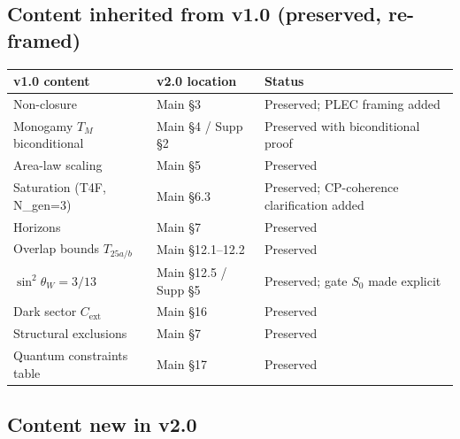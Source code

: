\documentclass[11pt]{article}
\theoremstyle{definition}
\begin{document}
\subsection{Content inherited from v1.0 (preserved, re-framed)}\label{sec:inherited_v1}

\begin{center}\small
\begin{tabular}{@{}l l l@{}}
\toprule
\textbf{v1.0 content} & \textbf{v2.0 location} & \textbf{Status} \\
\midrule
Non-closure & Main \S3 & Preserved; PLEC framing added \\
Monogamy $T_M$ biconditional & Main \S4 / Supp \S2 & Preserved with biconditional proof \\
Area-law scaling & Main \S5 & Preserved \\
Saturation (T4F, N\_gen=3) & Main \S6.3 & Preserved; CP-coherence clarification added \\
Horizons & Main \S7 & Preserved \\
Overlap bounds $T_{25a/b}$ & Main \S12.1--12.2 & Preserved \\
$\sin^2\theta_W = 3/13$ & Main \S12.5 / Supp \S5 & Preserved; gate $S_0$ made explicit \\
Dark sector $C_{\mathrm{ext}}$ & Main \S16 & Preserved \\
Structural exclusions & Main \S7 & Preserved \\
Quantum constraints table & Main \S17 & Preserved \\
\bottomrule
\end{tabular}
\end{center}

\subsection{Content new in v2.0}\label{sec:new_v2}
\end{document}
